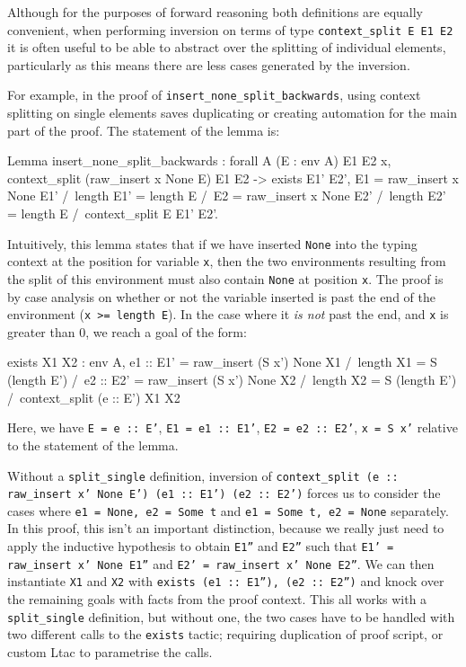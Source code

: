 \documentclass[]{unswthesis}
\let\c\texttt
\let\i\textit
\begin{document}
Although for the purposes of forward reasoning both definitions are equally convenient, when performing inversion on terms of type \c{context_split E E1 E2} it is often useful to be able to abstract over the splitting of individual elements, particularly as this means there are less cases generated by the inversion.

For example, in the proof of \c{insert_none_split_backwards}, using context splitting on single elements saves duplicating or creating automation for the main part of the proof. The statement of the lemma is:

\begin{coqcode}
Lemma insert_none_split_backwards : forall A (E : env A) E1 E2 x,
  context_split (raw_insert x None E) E1 E2 ->
  exists E1' E2',
    E1 = raw_insert x None E1' /\
    length E1' = length E /\
    E2 = raw_insert x None E2' /\
    length E2' = length E /\
    context_split E E1' E2'.
\end{coqcode}

Intuitively, this lemma states that if we have inserted \c{None} into the typing context at the position for variable \c{x}, then the two environments resulting from the split of this environment must also contain \c{None} at position \c{x}. The proof is by case analysis on whether or not the variable inserted is past the end of the environment (\c{x >= length E}). In the case where it \i{is not} past the end, and \c{x} is greater than 0, we reach a goal of the form:

\begin{coqcode}
exists X1 X2 : env A,
  e1 :: E1' = raw_insert (S x') None X1 /\
  length X1 = S (length E') /\
  e2 :: E2' = raw_insert (S x') None X2 /\
  length X2 = S (length E') /\
  context_split (e :: E') X1 X2
\end{coqcode}

Here, we have \c{E = e :: E'}, \c{E1 = e1 :: E1'}, \c{E2 = e2 :: E2'}, \c{x = S x'} relative to the statement of the lemma.

Without a \c{split_single} definition, inversion of \c{context_split (e :: raw_insert x' None E') (e1 :: E1') (e2 :: E2')} forces us to consider the cases where \c{e1 = None, e2 = Some t} and \c{e1 = Some t, e2 = None} separately. In this proof, this isn't an important distinction, because we really just need to apply the inductive hypothesis to obtain \c{E1''} and \c{E2''} such that \c{E1' = raw_insert x' None E1''} and \c{E2' = raw_insert x' None E2''}. We can then instantiate \c{X1} and \c{X2} with \c{exists (e1 :: E1''), (e2 :: E2'')} and knock over the remaining goals with facts from the proof context. This all works with a \c{split_single} definition, but without one, the two cases have to be handled with two different calls to the \c{exists} tactic; requiring duplication of proof script, or custom Ltac to parametrise the calls.
\end{document}
